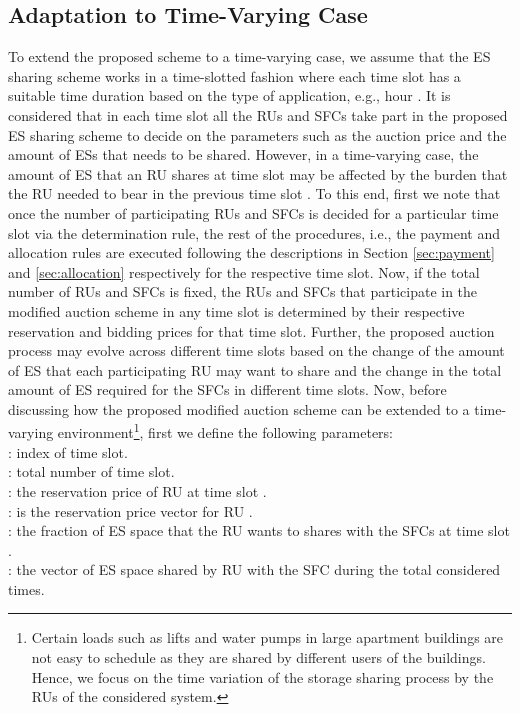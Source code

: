 \documentclass[journal,10pt]{IEEEtran}
\begin{document}
\subsection{Adaptation to Time-Varying Case}\label{sec:time-varying}
To extend the proposed scheme to a time-varying case, we assume that the ES sharing scheme works in a time-slotted fashion where each time slot has a suitable time duration based on the type of application, e.g.,  hour \cite{Derin:2010}. It is considered that in each time slot all the RUs and SFCs take part in the proposed ES sharing scheme to decide on the parameters such as the auction price and the amount of ESs that needs to be shared. However, in a time-varying case, the amount of ES that an RU shares at time slot  may be affected by the burden that the RU needed to bear in the previous time slot . To this end, first we note that once the number of participating RUs and SFCs is decided for a particular time slot via the determination rule, the rest of the procedures, i.e., the payment and allocation rules are executed following the descriptions in Section \ref{sec:payment} and \ref{sec:allocation} respectively for the respective time slot. Now, if the total number of RUs and SFCs is fixed, the RUs and SFCs that participate in the modified auction scheme in any time slot is determined by their respective reservation and bidding prices for that time slot. Further, the proposed auction process may evolve across different time slots based on the change of the amount of ES that each participating RU  may want to share and the change in the total amount of ES required for the SFCs in different time slots. Now, before discussing how the proposed modified auction scheme can be extended to a time-varying environment\footnote{Certain loads such as lifts and water pumps in large apartment buildings are not easy to schedule as they are shared by different users of the buildings. Hence, we focus on the time variation of the storage sharing process by the RUs of the considered system.}, first we define the following parameters:\\
: index of time slot.\\
: total number of time slot.\\
: the reservation price of RU  at time slot .\\
: is the reservation price vector for RU .\\
: the fraction of ES space that the RU  wants to shares with the SFCs at time slot .\\
: the vector of ES space shared by RU  with the SFC during the total considered times.\\
\end{document}
